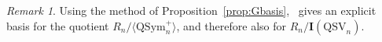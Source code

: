 \documentclass[12pt]{amsart}
\theoremstyle{definition}
\newtheorem{definition}[equation]{Definition}
\theoremstyle{remark}
\newtheorem{rem}[equation]{Remark}
\numberwithin{equation}{section}
\newcommand{\QSym}{\mathrm{QSym}}
\newcommand{\QSV}{\mathrm{QSV}}
\begin{document}
\begin{rem}
Using the method of Proposition~\ref{prop:Gbasis},~\cite[Theorem 4.1]{ABB} gives an explicit basis for the quotient $R_{n}\big/\langle \QSym_{n}^{+}\rangle$, and therefore also for $R_{n}\big/\mathbf{I}(\QSV_{n})$.
\end{rem}



%
%
%
%
%
%
% 
% 
% 
% 
\end{document}
